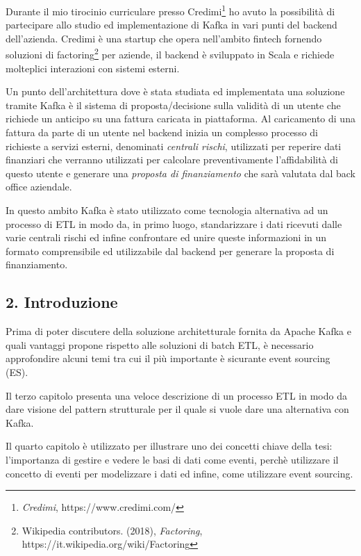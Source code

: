 \documentclass[]{article}
\begin{document}
\newpage

Durante il mio tirocinio curriculare presso Credimi\footnote{\emph{Credimi},
  https://www.credimi.com/} ho avuto la possibilità di partecipare allo
studio ed implementazione di Kafka in vari punti del backend
dell'azienda. Credimi è una startup che opera nell'ambito fintech
fornendo soluzioni di factoring\footnote{Wikipedia contributors. (2018),
  \emph{Factoring}, https://it.wikipedia.org/wiki/Factoring} per
aziende, il backend è sviluppato in Scala e richiede molteplici
interazioni con sistemi esterni.

Un punto dell'architettura dove è stata studiata ed implementata una
soluzione tramite Kafka è il sistema di proposta/decisione sulla
validità di un utente che richiede un anticipo su una fattura caricata
in piattaforma. Al caricamento di una fattura da parte di un utente nel
backend inizia un complesso processo di richieste a servizi esterni,
denominati \emph{centrali rischi}, utilizzati per reperire dati
finanziari che verranno utilizzati per calcolare preventivamente
l'affidabilità di questo utente e generare una \emph{proposta di
finanziamento} che sarà valutata dal back office aziendale.

In questo ambito Kafka è stato utilizzato come tecnologia alternativa ad
un processo di ETL in modo da, in primo luogo, standarizzare i dati
ricevuti dalle varie centrali rischi ed infine confrontare ed unire
queste informazioni in un formato comprensibile ed utilizzabile dal
backend per generare la proposta di finanziamento.

\newpage

\hypertarget{introduzione}{\subsection{2.
Introduzione}\label{introduzione}}

Prima di poter discutere della soluzione architetturale fornita da
Apache Kafka e quali vantaggi propone rispetto alle soluzioni di batch
ETL, è necessario approfondire alcuni temi tra cui il più importante è
sicurante event sourcing (ES).

Il terzo capitolo presenta una veloce descrizione di un processo ETL in
modo da dare visione del pattern strutturale per il quale si vuole dare
una alternativa con Kafka.

Il quarto capitolo è utilizzato per illustrare uno dei concetti chiave
della tesi: l'importanza di gestire e vedere le basi di dati come
eventi, perchè utilizzare il concetto di eventi per modelizzare i dati
ed infine, come utilizzare event sourcing.
\end{document}
